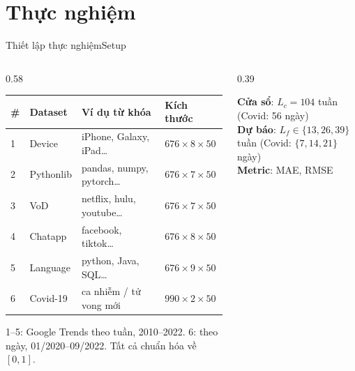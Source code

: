 \section{Thực nghiệm}



\begin{frame}{Thiết lập thực nghiệm}{Setup}
\begin{columns}[T,onlytextwidth]
\begin{column}{0.58\textwidth}
\small
\begin{tabular}[t]{@{}llll@{}}
  \toprule
  \# & Dataset & Ví dụ từ khóa & Kích thước \\
  \midrule
  1 & Device & iPhone, Galaxy, iPad\ldots & $676\times8\times50$ \\
  2 & Pythonlib & pandas, numpy, pytorch\ldots & $676\times7\times50$ \\
  3 & VoD & netflix, hulu, youtube\ldots & $676\times7\times50$ \\
  4 & Chatapp & facebook, tiktok\ldots & $676\times8\times50$ \\
  5 & Language & python, Java, SQL\ldots & $676\times9\times50$ \\
  6 & Covid-19 & ca nhiễm / tử vong mới & $990\times2\times50$ \\
  \bottomrule
\end{tabular}\par
\vspace{1mm}
{\scriptsize\color{DTMuted}1--5: Google Trends theo tuần, 2010--2022. 6: theo ngày, 01/2020--09/2022. Tất cả chuẩn hóa về $[0,1]$.}
\end{column}
\begin{column}{0.39\textwidth}
\begin{questioncard}
  \small
  \textbf{Cửa sổ}: $L_c=104$ tuần (Covid: 56 ngày)\\
  \textbf{Dự báo}: $L_f\in\{13,26,39\}$ tuần (Covid: $\{7,14,21\}$ ngày)\\
  \textbf{Metric}: MAE, RMSE
\end{questioncard}

\end{column}
\end{columns}
\end{frame}
